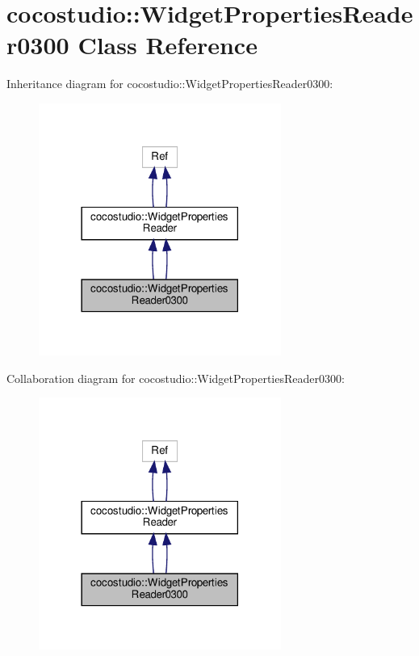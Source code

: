 \hypertarget{classcocostudio_1_1WidgetPropertiesReader0300}{}\section{cocostudio\+:\+:Widget\+Properties\+Reader0300 Class Reference}
\label{classcocostudio_1_1WidgetPropertiesReader0300}


Inheritance diagram for cocostudio\+:\+:Widget\+Properties\+Reader0300\+:
\nopagebreak
\begin{figure}[H]
\begin{center}
\leavevmode
\includegraphics[width=225pt]{classcocostudio_1_1WidgetPropertiesReader0300__inherit__graph}
\end{center}
\end{figure}


Collaboration diagram for cocostudio\+:\+:Widget\+Properties\+Reader0300\+:
\nopagebreak
\begin{figure}[H]
\begin{center}
\leavevmode
\includegraphics[width=225pt]{classcocostudio_1_1WidgetPropertiesReader0300__coll__graph}
\end{center}
\end{figure}
